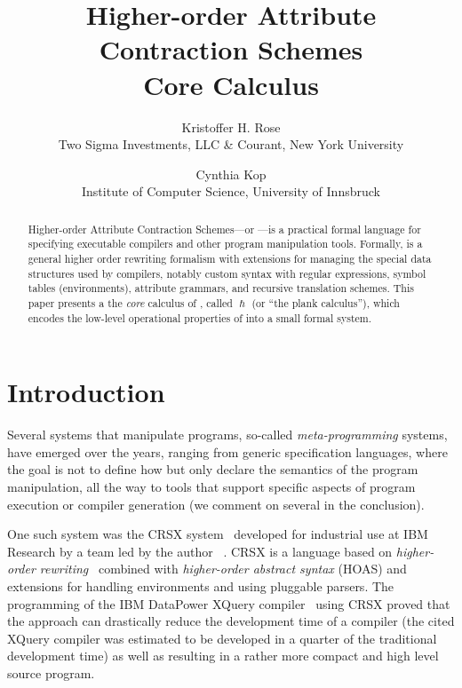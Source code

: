 \documentclass[letterpaper,11pt]{article}
\title{ Higher-order Attribute Contraction Schemes \\ Core Calculus }
\author{ Kristoffer H. Rose \\
 Two Sigma Investments, LLC \& Courant, New York University
 \and
 Cynthia Kop \\
 Institute of Computer Science, University of Innsbruck \\
}
\begin{document}
\maketitle

\begin{abstract}\noindent
  Higher-order Attribute Contraction Schemes---or \HAX---is a practical formal language for
  specifying executable compilers and other program manipulation tools.
  Formally, \HAX is a general higher order rewriting formalism with extensions for managing the
  special data structures used by compilers, notably custom syntax with regular expressions, symbol
  tables (\aka environments), attribute grammars, and recursive translation schemes.
  This paper presents a the \emph{core} calculus of \HAX, called $\hslash$ (or ``the plank calculus''),
  which encodes the low-level operational properties of \HAX into a small formal system.
\end{abstract}


\section{Introduction}\label{sec:intro}

Several systems that manipulate programs, so-called \emph{meta-programming} systems, have emerged
over the years, ranging from generic specification languages, where the goal is not to define how
but only declare the semantics of the program manipulation, all the way to tools that support
specific aspects of program execution or compiler generation (we comment on several in the
conclusion).

One such system was the CRSX system~\cite{Rose:1996} developed for industrial use at IBM Research by
a team led by the author~\cite{Rose:hor2010,Rose:rta2011,crsx} .  CRSX is a language based on
\emph{higher-order rewriting}~\cite{Jouannaud:klop2005} combined with \emph{higher-order abstract
  syntax} (HOAS) \cite{PfenningElliot:pldi1988} and extensions for handling environments and using
pluggable parsers.  The programming of the IBM Data\-Power XQuery compiler~\cite{dp60:ibm2013} using
CRSX proved that the approach can drastically reduce the development time of a compiler (the cited
XQuery compiler was estimated to be developed in a quarter of the traditional development time) as
well as resulting in a rather more compact and high level source program.
\end{document}
